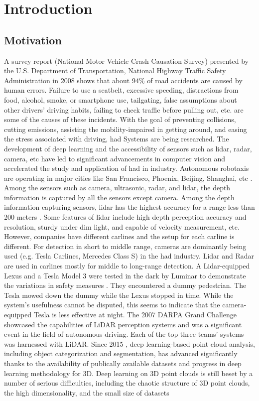 \chapter{Introduction}

\section{Motivation}
A survey report (National Motor Vehicle Crash Causation Survey) presented by the  U.S. Department of
Transportation, National Highway Traffic Safety Administration in 2008 \parencite{nmvccs} shows that about \(94\%\) of road accidents are caused by human errors. Failure to use a seatbelt, excessive speeding, distractions from food, alcohol, smoke, or smartphone use, tailgating, false assumptions about other drivers' driving habits, failing to check traffic before pulling out, etc. are some of the causes of these incidents. With the goal of preventing collisions, cutting emissions, assisting the mobility-impaired in getting around, and easing the stress associated with driving, \acrfull{had} Systems are being researched. The development of deep learning and the accessibility of sensors such as lidar, radar, camera, etc have led to significant advancements in computer vision and accelerated the study and application of \acrshort{had} in industry. Autonomous robotaxis are operating in major cities like San Francisco, Phoenix, Beijing, Shanghai, etc \parencite{robotaxis}. Among the sensors such as camera, ultrasonic, radar, and lidar, the depth information is captured by all the sensors except camera. Among the depth information capturing sensors, lidar has the highest accuracy for a range less than 200 meters \parencite{Yurtsever_2020}. Some features of lidar include high depth perception accuracy and resolution, sturdy under dim light, and capable of velocity measurement, etc. However, companies have different carlines and the setup for each carline is different. For detection in short to middle range, cameras are dominantly being used (e.g. Tesla Carlines, Mercedes Class S) in the \acrshort{had} industry. Lidar and Radar are used in carlines mostly for middle to long-range detection. A Lidar-equipped Lexus and a Tesla Model 3 were tested in the dark by Luminar to demonstrate the variations in safety measures \parencite{tesla_vs_lexus}. They encountered a dummy pedestrian. The Tesla mowed down the dummy while the Lexus stopped in time. While the system's usefulness cannot be disputed, this seems to indicate that the camera-equipped Tesla is less effective at night. The 2007 DARPA Grand Challenge showcased the capabilities of LiDAR perception systems and was a significant event in the field of autonomous driving. Each of the top three teams' systems was harnessed with LiDAR. Since 2015 \parencite{guo2020deep}, deep learning-based point cloud analysis, including object categorization and segmentation, has advanced significantly thanks to the availability of publically available datasets and progress in deep learning methodology for 3D. Deep learning on 3D point clouds is still beset by a number of serious difficulties, including the chaotic structure of 3D point clouds, the high dimensionality, and the small size of datasets 